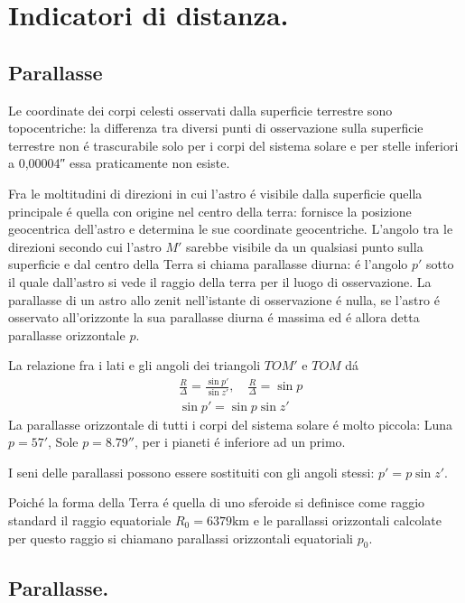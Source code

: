 \section{Indicatori di distanza.}

\subsection{Parallasse}

Le coordinate dei corpi celesti osservati dalla superficie terrestre sono topocentriche: la differenza tra diversi punti di osservazione sulla superficie terrestre non \'e trascurabile solo per i corpi del sistema solare e per stelle inferiori a \ang{;;0,00004} essa praticamente non esiste.

Fra le moltitudini di direzioni in cui l'astro \'e visibile dalla superficie quella principale \'e quella con origine nel centro della terra: fornisce la posizione geocentrica dell'astro e determina le sue coordinate geocentriche. L'angolo tra le direzioni secondo cui l'astro $M'$ sarebbe visibile da un qualsiasi punto sulla superficie e dal centro della Terra si chiama parallasse diurna: \'e l'angolo $p'$ sotto il quale dall'astro si vede il raggio della terra per il luogo di osservazione. La parallasse di un astro allo zenit nell'istante di osservazione \'e nulla, se l'astro \'e osservato all'orizzonte la sua parallasse diurna \'e massima ed \'e allora detta parallasse orizzontale $p$.





La relazione fra i lati e gli angoli dei triangoli $TOM'$ e $TOM$ d\'a
\begin{align*}
&\frac{R}{\Delta}=\frac{\sin{p'}}{\sin{z'}},\quad \frac{R}{\Delta}=\sin{p}\\
&\sin{p'}=\sin{p}\sin{z'}
\end{align*}
 La parallasse orizzontale di tutti i corpi del sistema solare \'e molto piccola: Luna $p=\ang{;57;}$, Sole $p=\ang{;;8.79}$, per i pianeti \'e inferiore ad un primo.

I seni delle parallassi possono essere sostituiti con gli angoli stessi: $p'=p\sin{z'}$. 

Poich\'e la forma della Terra \'e quella di uno sferoide si definisce come raggio standard il raggio equatoriale $R_0=6379\si{\kilo\meter}$ e le parallassi orizzontali calcolate per questo raggio si chiamano parallassi orizzontali equatoriali $p_0$.


\subsection{Parallasse.}


